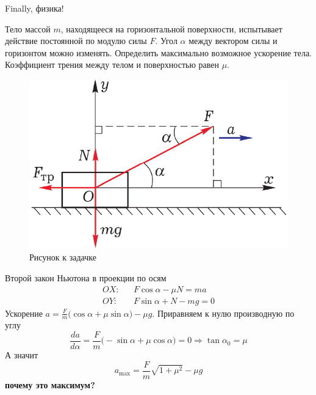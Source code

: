 Finally, физика!
\begin{example}
    Тело массой $m$, находящееся на горизонтальной поверхности, испытывает действие постоянной по модулю силы $F$. Угол $\alpha$ между вектором силы и горизонтом можно изменять. Определить максимально возможное ускорение тела. Коэффициент трения между телом и поверхностью равен $\mu$.

    \begin{figure}[h!]
        \centering
        \includegraphics[scale=0.7]{pics/phys_force_extr.png}
        \caption{Рисунок к задачке}
    \end{figure}

    Второй закон Ньютона в проекции по осям
    \begin{eqnarray*}
        OX: && F \cos \alpha - \mu N = m a\\
        OY: && F \sin \alpha  +N - mg = 0
    \end{eqnarray*}
    Ускорение $a = \frac{F}{m} \bigl(\cos \alpha + \mu \sin \alpha \bigr) - \mu g$. Приравняем к нулю производную по углу
    \begin{equation*}
        \frac{da}{d\alpha} = \frac{F}{m} \bigl(-\sin \alpha + \mu \cos \alpha \bigr) = 0 \Rightarrow \tan \alpha_{0} = \mu
    \end{equation*}
    А значит 
    \begin{equation*}
        a_{\text{max}} = \frac{F}{m} \sqrt{1 + \mu^2} - \mu g
    \end{equation*}
    \textbf{почему это максимум?}
\end{example}
